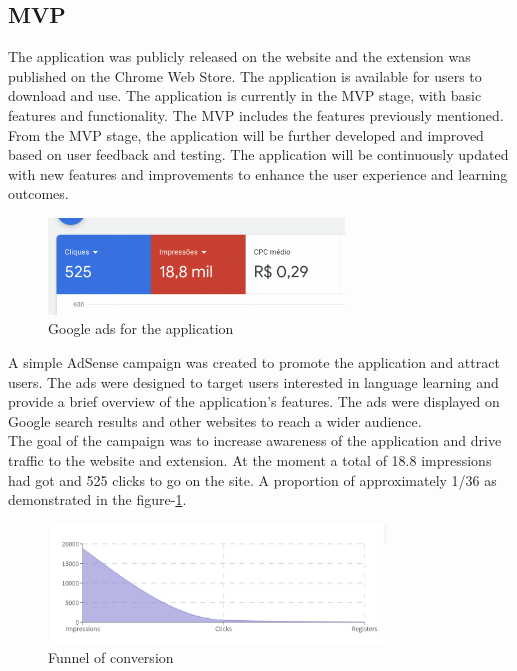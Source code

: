 \documentclass[12pt]{article}
\begin{document}
\subsection{MVP}
The application was publicly released on the website and the extension was published on the Chrome Web Store. The application is available for users to download and use. The application is currently in the MVP stage, with basic features and functionality. The MVP includes the features previously mentioned. \\
From the MVP stage, the application will be further developed and improved based on user feedback and testing. The application will be continuously updated with new features and improvements to enhance the user experience and learning outcomes. 
\begin{figure}[!h]
  \centering
  \caption{
  Google ads for the application
  }
  \label{fig:google1}
  \includegraphics[width=0.70\textwidth]{assets/30.png}
\end{figure}
A simple AdSense campaign was created to promote the application and attract users. The ads were designed to target users interested in language learning and provide a brief overview of the application's features. The ads were displayed on Google search results and other websites to reach a wider audience.\\
The goal of the campaign was to increase awareness of the application and drive traffic to the website and extension. At the moment a total of 18.8 impressions had got and 525 clicks to go on the site. A proportion of approximately 1/36 as demonstrated in the figure-\ref{fig:google1}. \\
\begin{figure}[!h]
  \centering
  \caption{
  Funnel of conversion
  }
  \label{fig:funnel}
  \includegraphics[width=0.80\textwidth]{assets/31.png}
\end{figure}
\end{document}
